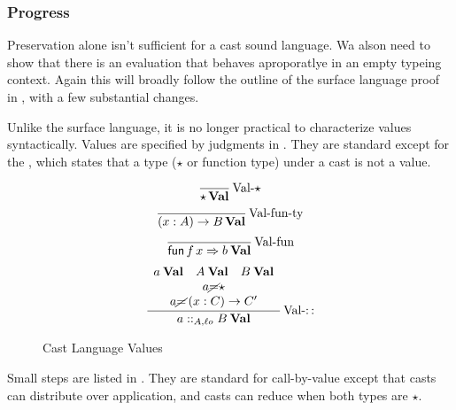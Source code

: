
\subsubsection{Progress}

Preservation alone isn't sufficient for a cast sound language.
Wa alson need to show that there is an evaluation that behaves aproporatlye in an empty typeing context.
Again this will broadly follow the outline of the surface language proof in , with a few substantial changes.

Unlike the surface language, it is no longer practical to characterize values syntactically.
Values are specified by judgments in . 
They are standard except for the , which states that a type ($\star$ or function type) under a cast is not a value.

\begin{figure}
\[
\frac{\,}{\star\,\textbf{Val}}
\operatorname{Val-\star}
\]
\[
\frac{\,}{\left(x:A\right)\rightarrow B\,\textbf{Val}}
\operatorname{Val-fun-ty}
\]
\[
\frac{\,}{\mathsf{fun}\,f\,x\Rightarrow b\:\textbf{Val}}
\operatorname{Val-fun}
\]
\[
\frac{\begin{array}{c}
a\:\textbf{Val}\quad A\:\textbf{Val}\quad B\:\textbf{Val}\\
a\cancel{=}\star\\
a\cancel{=}\left(x:C\right)\rightarrow C'
\end{array}}{a::_{A,\ell o}B\:\textbf{Val}}
\operatorname{Val-::}
\]
\caption{Cast Language Values}
\label{fig:cast-val}
\end{figure}

Small steps are listed in .
They are standard for call-by-value except that casts can distribute over application, and casts can reduce when both types are $\star$.

